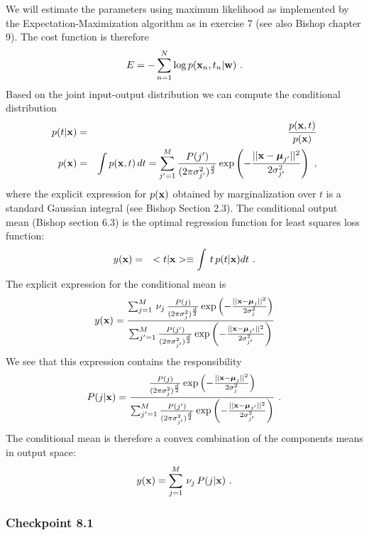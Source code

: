 \documentclass[12pt]{article}    %
\def\xb{{\bf x}}
\def\wb{{\bf w}}
\def\mub{\text{\boldmath $\mu$}}
\begin{document}
We will estimate the parameters using maximum likelihood as implemented by
the Expectation-Maximization
algorithm as in exercise 7 (see also Bishop chapter 9). The cost function is therefore
$$
E = - \sum_{n=1}^N \log p(\xb_n,t_n|\wb) \ .
$$
%
Based on the joint input-output distribution we can compute the conditional distribution
\begin{eqnarray*}
p(t|\xb) & = & \frac{p(\xb,t) }{p(\xb) }  \\ p(\xb) & = & \int p(\xb,t) \, dt = 
\sum_{j'=1}^{M} \frac{P(j')}{
(2\pi\sigma^{2}_{j'})^{\frac{d}{2}}} \exp \left(
-\frac{||\xb-\mub_{j'}||^2}{2\sigma^{2}_{j'}}\right) \ , 
\end{eqnarray*}
where the explicit expression for $p(\xb)$ obtained by marginalization over $t$ is a standard Gaussian integral (see Bishop Section 2.3).  
The conditional output mean (Bishop section 6.3) is the optimal regression function for least squares loss function:
\begin{eqnarray*}
y(\xb) & = & <t|\xb> \equiv \int \, t \, p(t|\xb) dt \ .
\end{eqnarray*}
The explicit expression for the conditional mean is
\begin{eqnarray}
y(\xb) = \frac{\sum_{j=1}^{M} \, \nu_j \,
\frac{P(j)}{(2\pi\sigma^{2}_{j})^{\frac{d}{2}}} \exp
\left(-\frac{||\xb-\mub_j||^2}{2\sigma^{2}_{j}}\right)}
{\sum_{j'=1}^{M} \frac{P(j')}{
(2\pi\sigma^{2}_{j'})^{\frac{d}{2}}} \exp \left(
-\frac{||\xb-\mub_{j'}||^2}{2\sigma^{2}_{j'}}\right)}\nonumber
\end{eqnarray}
We see that this expression contains the responsibility
$$
P(j|\xb) = \frac{\frac{P(j)}{(2\pi\sigma^{2}_{j})^{\frac{d}{2}}} \exp
\left(-\frac{||\xb-\mub_j||^2}{2\sigma^{2}_{j}}\right)}
{\sum_{j'=1}^{M} \frac{P(j')}{
(2\pi\sigma^{2}_{j'})^{\frac{d}{2}}} \exp \left(
-\frac{||\xb-\mub_{j'}||^2}{2\sigma^{2}_{j'}}\right)} \ .
$$
The conditional mean is therefore a convex combination of the components
means in output space:
$$
y(\xb) = \sum_{j=1}^{M} \, \nu_j \, P(j|\xb) \ .
$$

\subsubsection*{Checkpoint 8.1}
\end{document}
